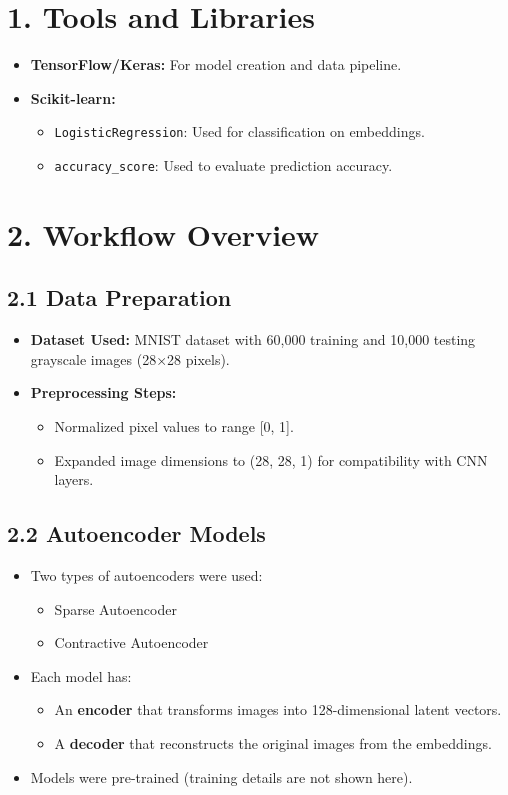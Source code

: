 \documentclass[12pt]{article}
\begin{document}
\section*{1. Tools and Libraries}

\begin{itemize}
    \item \textbf{TensorFlow/Keras:} For model creation and data pipeline.
    \item \textbf{Scikit-learn:}
    \begin{itemize}
        \item \texttt{LogisticRegression}: Used for classification on embeddings.
        \item \texttt{accuracy\_score}: Used to evaluate prediction accuracy.
    \end{itemize}
\end{itemize}

\section*{2. Workflow Overview}

\subsection*{2.1 Data Preparation}
\begin{itemize}
    \item \textbf{Dataset Used:} MNIST dataset with 60,000 training and 10,000 testing grayscale images (28×28 pixels).
    \item \textbf{Preprocessing Steps:}
    \begin{itemize}
        \item Normalized pixel values to range [0, 1].
        \item Expanded image dimensions to (28, 28, 1) for compatibility with CNN layers.
    \end{itemize}
\end{itemize}

\subsection*{2.2 Autoencoder Models}
\begin{itemize}
    \item Two types of autoencoders were used:
    \begin{itemize}
        \item Sparse Autoencoder
        \item Contractive Autoencoder
    \end{itemize}
    \item Each model has:
    \begin{itemize}
        \item An \textbf{encoder} that transforms images into 128-dimensional latent vectors.
        \item A \textbf{decoder} that reconstructs the original images from the embeddings.
    \end{itemize}
    \item Models were pre-trained (training details are not shown here).
\end{itemize}
\end{document}
